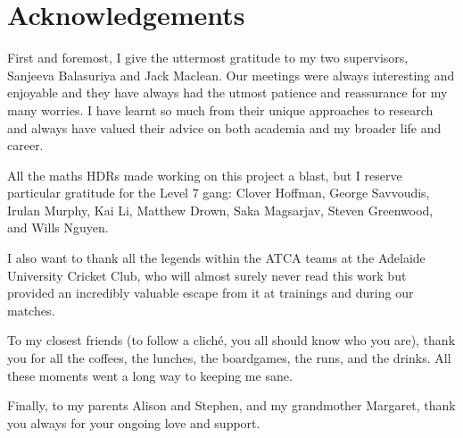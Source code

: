 \chapter{Acknowledgements}
\label{ch:acknowledgements}

First and foremost, I give the uttermost gratitude to my two supervisors, Sanjeeva Balasuriya and Jack Maclean.
Our meetings were always interesting and enjoyable and they have always had the utmost patience and reassurance for my many worries.
I have learnt so much from their unique approaches to research and always have valued their advice on both academia and my broader life and career.

All the maths HDRs made working on this project a blast, but I reserve particular gratitude for the Level 7 gang: Clover Hoffman, George Savvoudis, Irulan Murphy, Kai Li, Matthew Drown, Saka Magsarjav, Steven Greenwood, and Wills Nguyen.

I also want to thank all the legends within the ATCA teams at the Adelaide University Cricket Club, who will almost surely never read this work but provided an incredibly valuable escape from it at trainings and during our matches.

To my closest friends (to follow a clich\'e, you all should know who you are), thank you for all the coffees, the lunches, the boardgames, the runs, and the drinks.
All these moments went a long way to keeping me sane.

Finally, to my parents Alison and Stephen, and my grandmother Margaret, thank you always for your ongoing love and support.
